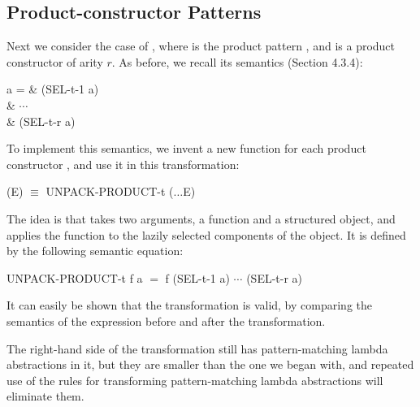 \subsection{Product-constructor Patterns}

Next we consider the case of , where  is the product pattern
, and  is a product constructor of arity $r$. As before, we recall its
semantics (Section 4.3.4):
\begin{letalign}
	 a =  & (SEL-t-1 a)\\
	& $\cdots$\\
	& (SEL-t-r a)
\end{letalign}

To implement this semantics, we invent a new function
 for each product constructor , and use it in this
transformation:
\begin{mlcoded}
(E) $\equiv$ UNPACK-PRODUCT-t ($\ldots$E)
\end{mlcoded}
The idea is that  takes two arguments, a function and a
structured object, and applies the function to the lazily selected components
of the object. It is defined by the following semantic equation:
\begin{mlcoded}
UNPACK-PRODUCT-t f a $=$ f (SEL-t-1 a) $\cdots$ (SEL-t-r a)
\end{mlcoded}
It can easily be shown that the transformation is valid, by comparing the 
semantics of the expression before and after the transformation.

The right-hand side of the transformation still has pattern-matching lambda
abstractions in it, but they are smaller than the one we began with, and
repeated use of the rules for transforming pattern-matching lambda 
abstractions will eliminate them.

